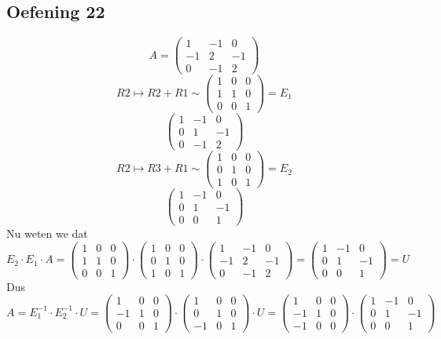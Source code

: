\documentclass[lineaire_algebra_oplossingen.tex]{subfiles}
\begin{document}
\subsection{Oefening 22}
\[
A=
\begin{pmatrix}
1 & -1 & 0 \\
-1 & 2 & -1 \\
0 & -1 & 2 
\end{pmatrix}
\]
\[
R2 \longmapsto R2+R1 \sim
\begin{pmatrix}
1 & 0 & 0\\
1 & 1 & 0\\
0 & 0 & 1 
\end{pmatrix}
=E_1
\]
\[
\begin{pmatrix}
1 & -1 & 0 \\
0 & 1 & -1 \\
0 & -1 & 2  
\end{pmatrix}
\]
\[
R2 \longmapsto R3+R1 \sim
\begin{pmatrix}
1 & 0 & 0\\
0 & 1 & 0\\
1 & 0 & 1 
\end{pmatrix}
=E_2
\]
\[
\begin{pmatrix}
1 & -1 & 0 \\
0 & 1 & -1 \\
0 & 0 & 1 
\end{pmatrix}
\]
Nu weten we dat
\[
E_2 \cdot E_1 \cdot A 
=
\begin{pmatrix}
1 & 0 & 0\\
1 & 1 & 0\\
0 & 0 & 1 
\end{pmatrix}
\cdot
\begin{pmatrix}
1 & 0 & 0\\
0 & 1 & 0\\
1 & 0 & 1 
\end{pmatrix}
\cdot
\begin{pmatrix}
1 & -1 & 0 \\
-1 & 2 & -1 \\
0 & -1 & 2 
\end{pmatrix}
=
\begin{pmatrix}
1 & -1 & 0 \\
0 & 1 & -1 \\
0 & 0 & 1 
\end{pmatrix}
= U
\]
Dus
\[
A = E_1^{-1} \cdot E_2^{-1} \cdot U
=
\begin{pmatrix}
1 & 0 & 0\\
-1 & 1 & 0\\
0 & 0 & 1 
\end{pmatrix}
\cdot
\begin{pmatrix}
1 & 0 & 0\\
0 & 1 & 0\\
-1 & 0 & 1 
\end{pmatrix}
\cdot
U
=
\begin{pmatrix}
1 & 0 & 0\\
-1 & 1 & 0\\
-1 & 0 & 0
\end{pmatrix}
\cdot
\begin{pmatrix}
1 & -1 & 0 \\
0 & 1 & -1 \\
0 & 0 & 1 
\end{pmatrix}
\]
\end{document}

